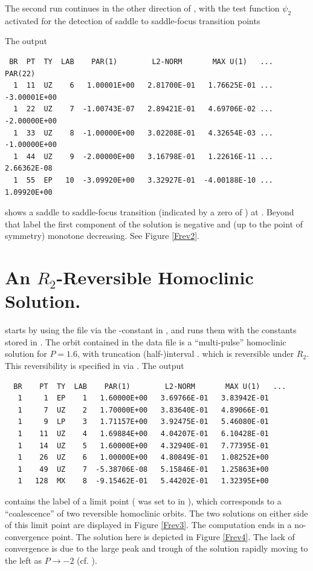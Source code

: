 \documentclass[12pt]{report}
\begin{document}
The second run continues in the other direction of , with
the test function $\psi_2$ activated 
for the detection of saddle to saddle-focus transition points
\begin{center}
\end{center}
The output
\begin{verbatim}
 BR  PT  TY  LAB    PAR(1)        L2-NORM       MAX U(1)   ...   PAR(22)    
  1  11  UZ    6   1.00001E+00   2.81700E-01   1.76625E-01 ... -3.00001E+00
  1  22  UZ    7  -1.00743E-07   2.89421E-01   4.69706E-02 ... -2.00000E+00
  1  33  UZ    8  -1.00000E+00   3.02208E-01   4.32654E-03 ... -1.00000E+00
  1  44  UZ    9  -2.00000E+00   3.16798E-01   1.22616E-11 ...  2.66362E-08
  1  55  EP   10  -3.09920E+00   3.32927E-01  -4.00188E-10 ...  1.09920E+00
\end{verbatim}
shows a saddle to saddle-focus transition 
(indicated by a zero of ) at . Beyond
that label the first component of the solution is negative and (up to the
point of symmetry) monotone decreasing. See Figure \ref{Frev2}.

\section{An \texorpdfstring{$R_2$}{R2}-Reversible Homoclinic Solution.}

\begin{center}
\end{center}
starts by using the file  via the
 \AUTO-constant in ,
and runs them with the constants stored in . 
The orbit contained in
the data file is a ``multi-pulse'' homoclinic solution for $P=1.6$, with
truncation (half-)interval .
which is reversible under $R_2$. This reversibility is
specified in  via .
The output 
\begin{verbatim}
  BR    PT  TY  LAB    PAR(1)        L2-NORM       MAX U(1)   ...
   1     1  EP    1   1.60000E+00   3.69766E-01   3.83942E-01
   1     7  UZ    2   1.70000E+00   3.83640E-01   4.89066E-01
   1     9  LP    3   1.71157E+00   3.92475E-01   5.46080E-01
   1    11  UZ    4   1.69884E+00   4.04207E-01   6.10428E-01
   1    14  UZ    5   1.60000E+00   4.32940E-01   7.77395E-01
   1    26  UZ    6   1.00000E+00   4.80849E-01   1.08252E+00
   1    49  UZ    7  -5.38706E-08   5.15846E-01   1.25863E+00
   1   128  MX    8  -9.15462E-01   5.44202E-01   1.32395E+00
\end{verbatim}
contains the label of a limit point ( was set to  in
), which corresponds to a ``coalescence'' of two reversible
homoclinic orbits. The two solutions on either side of this limit point are
displayed in Figure \ref{Frev3}. The computation ends in a no-convergence
point. The solution here is depicted in Figure \ref{Frev4}. The lack of
convergence is due to the large peak and trough of the solution rapidly
moving to the left as $P \to -2$ (cf. ).
\end{document}
